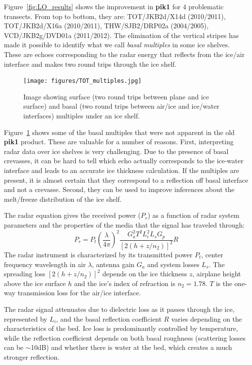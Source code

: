 \documentclass[11pt]{article}
\newcommand{\figref}[1]{Figure~\ref{#1}}
\begin{document}
\figref{fig:LO_results} shows the improvement in \textbf{pik1} for 4 problematic transects. From top to bottom, they are: TOT/JKB2d/X14d (2010/2011), TOT/JKB2d/X16a (2010/2011), THW/SJB2/DRP02a (2004/2005), VCD/JKB2g/DVD01a (2011/2012). 
The elimination of the vertical stripes has made it possible to identify what we call \emph{basal multiples} in some ice shelves. These are echoes corresponding to the radar energy that reflects from the ice/air interface and makes two round trips through the ice shelf. 

\begin{figure}[ht!]
\centering
\texttt{[image: figures/TOT\_multiples.jpg]}
\caption[]{Image showing surface (two round trips between plane and ice surface) and basal (two round trips between air/ice and ice/water interfaces) multiples under an ice shelf.}
\label{fig:multiples}
\end{figure}

\figref{fig:multiples} shows some of the basal multiples that were not apparent in the old \textbf{pik1} product. These are valuable for a number of reasons. First, interpreting radar data over ice shelves is very challenging. Due to the presence of basal crevasses, it can be hard to tell which echo actually corresponds to the ice-water interface and leads to an accurate ice thickness calculation. If the multiples are present, it is almost certain that they correspond to a reflection off basal interface and not a crevasse. Second, they can be used to improve inferences about the melt/freeze distribution of the ice shelf.

The radar equation gives the received power ($P_r$) as a function of radar system parameters and the properties of the media that the signal has traveled through:
\begin{equation}
P_r = P_t \left(\frac{\lambda}{4\pi}\right)^2 \frac{G_a^2 T^2 L_i^2 L_s G_p}{\left[2\left(h+z/n_2 \right) \right]^2}R
\end{equation}
The radar instrument is characterized by its transmitted power $P_t$, center frequency wavelength in air $\lambda$, antenna gain $G_a$ and system losses $L_s$. The spreading loss $\left[2\left(h+z/n_2 \right) \right]^2$ depends on the ice thickness $z$, airplane height above the ice surface $h$ and the ice's index of refraction is $n_2=1.78$. $T$ is the one-way transmission loss for the air/ice interface. 

The radar signal attenuates due to dielectric loss as it passes through the ice, represented by $L_i$, and the basal reflection coefficient $R$ varies depending on the characteristics of the bed. Ice loss is predominantly controlled by temperature, while the reflection coefficient depends on both basal roughness (scattering losses can be $\sim$10dB) and whether there is water at the bed, which creates a much stronger reflection.
\end{document}

